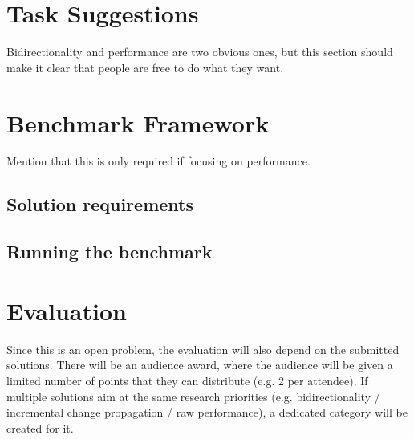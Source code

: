 \documentclass[a4paper]{scrarticle}
\begin{document}
\section{Task Suggestions}

Bidirectionality and performance are two obvious ones, but this section should
make it clear that people are free to do what they want.

\section{Benchmark Framework}

Mention that this is only required if focusing on performance.

\subsection{Solution requirements}

\subsection{Running the benchmark}

\section{Evaluation}

Since this is an open problem, the evaluation will also depend on the submitted
solutions. There will be an audience award, where the audience will be given a
limited number of points that they can distribute (e.g. 2 per attendee). If
multiple solutions aim at the same research priorities (e.g. bidirectionality /
incremental change propagation / raw performance), a dedicated category will be
created for it.
\end{document}

